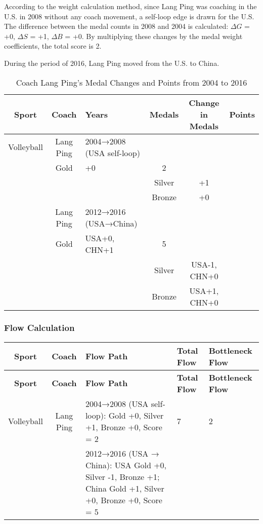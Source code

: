 \documentclass{mcmthesis}
\begin{document}
According to the weight calculation method, since Lang Ping was coaching in the U.S. in 2008 without any coach movement, a self-loop edge is drawn for the U.S. The difference between the medal counts in 2008 and 2004 is calculated: $\Delta G$ = +0, $\Delta S$ = +1, $\Delta B$ = +0. By multiplying these changes by the medal weight coefficients, the total score is 2.

During the period of 2016, Lang Ping moved from the U.S. to China. 

\begin{table}[ht]
    \centering
    \begin{tabular}{|c|c|p{2cm}|c|c|c|}
    \hline
    \textbf{Sport} & \textbf{Coach} & \textbf{Years} & \textbf{Medals} & \textbf{Change in Medals} & \textbf{Points} \\
    \hline
    Volleyball & Lang Ping & 2004→2008 (USA self-loop)\\ & Gold & +0 & 2 \\
               &             &                           & Silver & +1 &   \\
               &             &                           & Bronze & +0 &   \\
    \hline
               & Lang Ping & 2012→2016 (USA→China) \\& Gold & USA+0, CHN+1 & 5 \\
               &             &                         & Silver & USA-1, CHN+0 &   \\
               &             &                         & Bronze & USA+1, CHN+0 &   \\
    \hline
    \end{tabular}
    \caption{Coach Lang Ping's Medal Changes and Points from 2004 to 2016}
\end{table}
    
\subsubsection{Flow Calculation}


\begin{longtable}{|c|c|p{8cm}|p{1cm}|p{3cm}|}
\hline
\textbf{Sport} & \textbf{Coach} & \textbf{Flow Path} & \textbf{Total Flow} & \textbf{Bottleneck Flow} \\
\hline
\endfirsthead

\hline
\textbf{Sport} & \textbf{Coach} & \textbf{Flow Path} & \textbf{Total Flow} & \textbf{Bottleneck Flow} \\
\hline
\endhead

\hline
\endfoot

Volleyball & Lang Ping & 2004→2008 (USA self-loop): Gold +0, Silver +1, Bronze +0, Score = 2 & 7 & 2 \\
           &           & 2012→2016 (USA → China): USA Gold +0, Silver -1, Bronze +1; China Gold +1, Silver +0, Bronze +0, Score = 5 & & \\
\hline
\end{longtable}
\end{document}

